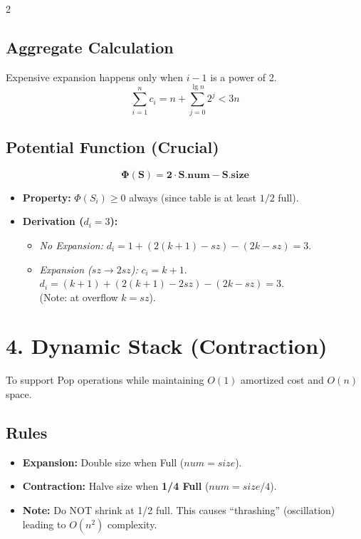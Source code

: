 \documentclass[10pt, a4paper]{article}
\newcommand{\potential}{\Phi}
\begin{document}
\begin{multicols*}{2}
\subsection*{Aggregate Calculation}
Expensive expansion happens only when $i-1$ is a power of 2.
\[ \sum_{i=1}^n c_i = n + \sum_{j=0}^{\lg n} 2^j < 3n \]

\subsection*{Potential Function (Crucial)}
\[ \boldsymbol{\potential(S) = 2 \cdot S.num - S.size} \]
\begin{itemize}
    \item \textbf{Property:} $\potential(S_i) \ge 0$ always (since table is at least $1/2$ full).
    \item \textbf{Derivation ($d_i = 3$):}
    \begin{itemize}
        \item \textit{No Expansion:} $d_i = 1 + (2(k+1)-sz) - (2k-sz) = 3$.
        \item \textit{Expansion ($sz \to 2sz$):} $c_i = k+1$. \\
        $d_i = (k+1) + (2(k+1)-2sz) - (2k-sz) = 3$.
        \\ (Note: at overflow $k=sz$).
    \end{itemize}
\end{itemize}

\section{4. Dynamic Stack (Contraction)}
To support Pop operations while maintaining $O(1)$ amortized cost and $O(n)$ space.

\subsection*{Rules}
\begin{itemize}
    \item \textbf{Expansion:} Double size when Full ($num = size$).
    \item \textbf{Contraction:} Halve size when \textbf{1/4 Full} ($num = size/4$).
    \item \textbf{Note:} Do NOT shrink at 1/2 full. This causes ``thrashing'' (oscillation) leading to $O(n^2)$ complexity.
\end{itemize}

\end{multicols*}
\end{document}
